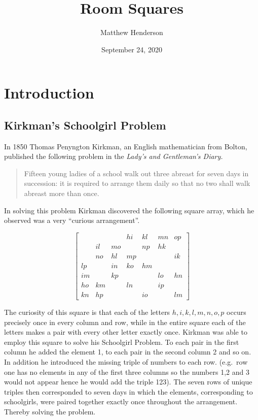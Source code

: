 \documentclass[
  11pt,
  a4paper]{book}
\title{Room Squares}
\author{Matthew Henderson}
\date{September 24, 2020}
\begin{document}
\maketitle

{
\setcounter{tocdepth}{1}
\tableofcontents
}
\hypertarget{introduction}{%
\chapter{Introduction}\label{introduction}}

\hypertarget{kirkmans-schoolgirl-problem}{%
\section{Kirkman's Schoolgirl Problem}\label{kirkmans-schoolgirl-problem}}

In 1850 Thomas Penyngton Kirkman, an English mathematician from Bolton,
published the following problem in the \emph{Lady's and Gentleman's Diary.}

\begin{quote}
Fifteen young ladies of a school walk out three abreast for seven
days in succession: it is required to arrange them daily so that no
two shall walk abreast more than once.
\end{quote}

In solving this problem Kirkman discovered the following square array,
which he observed was a very ``curious arrangement''.

\begin{equation}
  \begin{bmatrix}
       &    &    & hi & kl & mn & op \\
       & il & mo &    & np & hk &    \\
       & no & hl & mp &    &    & ik \\
    lp &    & in & ko & hm &    &    \\
    im &    & kp &    &    & lo & hn \\
    ho & km &    & ln &    & ip &    \\
    kn & hp &    &    & io &    & lm 
  \end{bmatrix}
\end{equation}

The curiosity of this square is that each of the letters
\(h, i, k, l, m, n, o, p\)
occurs precisely once in every column and row, while in the entire
square each of the letters makes a pair with every other letter exactly
once. Kirkman was able to employ this square to solve his Schoolgirl
Problem. To each pair in the first column he added the element 1, to
each pair in the second column 2 and so on. In addition he introduced
the missing triple of numbers to each row. (e.g.~row one has no elements
in any of the first three columns so the numbers 1,2 and 3 would not
appear hence he would add the triple 123). The seven rows of unique
triples then corresponded to seven days in which the elements,
corresponding to schoolgirls, were paired together exactly once
throughout the arrangement. Thereby solving the problem.
\end{document}
